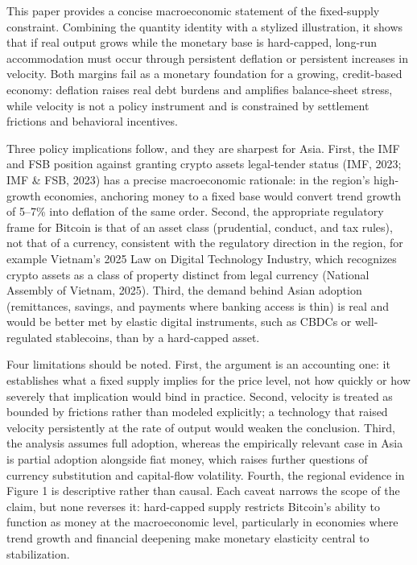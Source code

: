 \documentclass[12pt]{article}
\begin{document}
This paper provides a concise macroeconomic statement of the fixed-supply constraint. Combining the quantity identity with a stylized illustration, it shows that if real output grows while the monetary base is hard-capped, long-run accommodation must occur through persistent deflation or persistent increases in velocity. Both margins fail as a monetary foundation for a growing, credit-based economy: deflation raises real debt burdens and amplifies balance-sheet stress, while velocity is not a policy instrument and is constrained by settlement frictions and behavioral incentives.

Three policy implications follow, and they are sharpest for Asia. First, the IMF and FSB position against granting crypto assets legal-tender status (IMF, 2023; IMF \& FSB, 2023) has a precise macroeconomic rationale: in the region's high-growth economies, anchoring money to a fixed base would convert trend growth of 5--7\% into deflation of the same order. Second, the appropriate regulatory frame for Bitcoin is that of an asset class (prudential, conduct, and tax rules), not that of a currency, consistent with the regulatory direction in the region, for example Vietnam's 2025 Law on Digital Technology Industry, which recognizes crypto assets as a class of property distinct from legal currency (National Assembly of Vietnam, 2025). Third, the demand behind Asian adoption (remittances, savings, and payments where banking access is thin) is real and would be better met by elastic digital instruments, such as CBDCs or well-regulated stablecoins, than by a hard-capped asset.

Four limitations should be noted. First, the argument is an accounting one: it establishes what a fixed supply implies for the price level, not how quickly or how severely that implication would bind in practice. Second, velocity is treated as bounded by frictions rather than modeled explicitly; a technology that raised velocity persistently at the rate of output would weaken the conclusion. Third, the analysis assumes full adoption, whereas the empirically relevant case in Asia is partial adoption alongside fiat money, which raises further questions of currency substitution and capital-flow volatility. Fourth, the regional evidence in Figure 1 is descriptive rather than causal. Each caveat narrows the scope of the claim, but none reverses it: hard-capped supply restricts Bitcoin's ability to function as money at the macroeconomic level, particularly in economies where trend growth and financial deepening make monetary elasticity central to stabilization.
\end{document}
